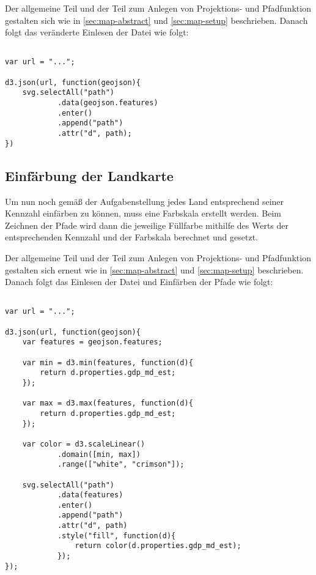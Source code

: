 Der allgemeine Teil und der Teil zum Anlegen von Projektions- und Pfadfunktion gestalten sich wie in \ref{sec:map-abstract} und \ref{sec:map-setup} beschrieben. Danach folgt das veränderte Einlesen der Datei wie folgt:

\begin{lstlisting}

var url = "...";

d3.json(url, function(geojson){
    svg.selectAll("path")
            .data(geojson.features)
            .enter()
            .append("path")
            .attr("d", path);
})

\end{lstlisting}

\subsection{Einfärbung der Landkarte}

Um nun noch gemäß der Aufgabenstellung jedes Land entsprechend seiner Kennzahl einfärben zu können, muss eine Farbskala erstellt werden. Beim Zeichnen der Pfade wird dann die jeweilige Füllfarbe mithilfe des Werts der entsprechenden Kennzahl und der Farbskala berechnet und gesetzt.

Der allgemeine Teil und der Teil zum Anlegen von Projektions- und Pfadfunktion gestalten sich erneut wie in \ref{sec:map-abstract} und \ref{sec:map-setup} beschrieben. Danach folgt das Einlesen der Datei und Einfärben der Pfade wie folgt:

\begin{lstlisting}

var url = "...";

d3.json(url, function(geojson){
    var features = geojson.features;

    var min = d3.min(features, function(d){
        return d.properties.gdp_md_est;
    });

    var max = d3.max(features, function(d){
        return d.properties.gdp_md_est;
    });

    var color = d3.scaleLinear()
            .domain([min, max])
            .range(["white", "crimson"]);

    svg.selectAll("path")
            .data(features)
            .enter()
            .append("path")
            .attr("d", path)
            .style("fill", function(d){
                return color(d.properties.gdp_md_est);
            });
});

\end{lstlisting}


